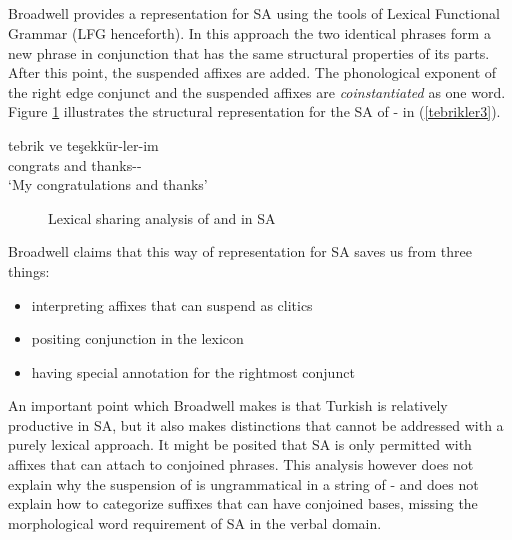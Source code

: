 \subsection{\cite{broadwell2008turkish}}
Broadwell provides a representation for SA using the tools of Lexical Functional Grammar (LFG henceforth). In this approach the two identical phrases form a new phrase in conjunction that has the same structural properties of its parts. After this point, the suspended affixes are added. The phonological exponent of the right edge conjunct and the suspended affixes are \textit{coinstantiated} as one word. Figure \ref{fig:lexicalshare} illustrates the structural representation for the SA of {\Pl-\Poss} in (\ref{tebrikler3}).

\begin{exe}
    \ex \label{tebrikler3}
    \gll 
    tebrik ve teşekkür-ler-im \\ congrats and thanks-{\Pl}-{\First}{\Sg} \\ 
    \glt `My congratulations and thanks'
\end{exe}
    
\begin{figure}[hbt!]
    \centering
{}
    \caption{Lexical sharing analysis of {\Pl} and {\Poss} in SA}
    \label{fig:lexicalshare}
\end{figure}

Broadwell claims that this way of representation for SA saves us from three things:
\begin{itemize}
    \item  interpreting affixes that can suspend as clitics
    \item positing conjunction in the lexicon
    \item having special annotation for the rightmost conjunct
\end{itemize}

An important point which Broadwell makes is that Turkish is relatively productive in SA, but it also makes distinctions that cannot be addressed with a purely lexical approach. It might be posited that SA is only permitted with affixes that can attach to conjoined phrases. This analysis however does not explain why the suspension of {\Poss} is ungrammatical in a string of {\Pl-\Poss} and does not explain how to categorize suffixes that can have conjoined bases, missing the morphological word requirement of SA in the verbal domain.
